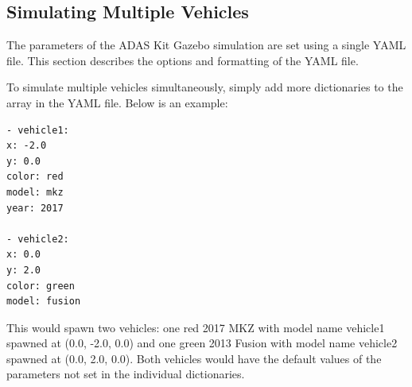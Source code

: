 \subsection{Simulating Multiple Vehicles}

The parameters of the ADAS Kit Gazebo simulation are set using a single YAML file. This section describes the options and formatting of the YAML file.

To simulate multiple vehicles simultaneously, simply add more dictionaries to the array in the YAML file. Below is an example:

\begin{lstlisting}[language=XML]
- vehicle1: 
x: -2.0
y: 0.0
color: red
model: mkz
year: 2017

- vehicle2:
x: 0.0
y: 2.0
color: green
model: fusion
\end{lstlisting}

This would spawn two vehicles: one red 2017 MKZ with model name vehicle1 spawned at (0.0, -2.0, 0.0) and one green 2013 Fusion with model name vehicle2 spawned at (0.0, 2.0, 0.0). Both vehicles would have the default values of the parameters not set in the individual dictionaries.



%


